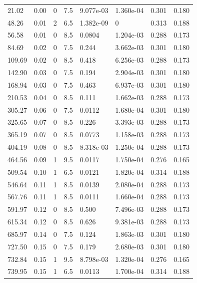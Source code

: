 \documentclass[preview]{standalone}
\begin{document}
{{\begin{tabular}{L{1.2cm}C{1.2cm} C{0.3cm}C{0.5cm} C{1.4cm}C{1.4cm} C{1.4cm}C{1.4cm}}
  21.02  &  0.00  & 0     & 7.5 &  9.077e-03  & 1.360e-04  & 0.301 &  0.180   \\ 
  48.26  &  0.01  & 2     & 6.5 &  1.382e-09  & 0  & 0.313 &  0.188   \\ 
  56.58  &  0.01  & 0     & 8.5 &  0.0804  & 1.204e-03  & 0.288 &  0.173   \\ 
  84.69  &  0.02  & 0     & 7.5 &  0.244  & 3.662e-03  & 0.301 &  0.180   \\ 
  109.69  &  0.02  & 0     & 8.5 &  0.418  & 6.256e-03  & 0.288 &  0.173   \\ 
  142.90  &  0.03  & 0     & 7.5 &  0.194  & 2.904e-03  & 0.301 &  0.180   \\ 
  168.94  &  0.03  & 0     & 7.5 &  0.463  & 6.937e-03  & 0.301 &  0.180   \\ 
  210.53  &  0.04  & 0     & 8.5 &  0.111  & 1.662e-03  & 0.288 &  0.173   \\ 
  305.27  &  0.06  & 0     & 7.5 &  0.0112  & 1.680e-04  & 0.301 &  0.180   \\ 
  325.65  &  0.07  & 0     & 8.5 &  0.226  & 3.393e-03  & 0.288 &  0.173   \\ 
  365.19  &  0.07  & 0     & 8.5 &  0.0773  & 1.158e-03  & 0.288 &  0.173   \\ 
  404.19  &  0.08  & 0     & 8.5 &  8.318e-03  & 1.250e-04  & 0.288 &  0.173   \\ 
  464.56  &  0.09  & 1     & 9.5 &  0.0117  & 1.750e-04  & 0.276 &  0.165   \\ 
  509.54  &  0.10  & 1     & 6.5 &  0.0121  & 1.820e-04  & 0.314 &  0.188   \\ 
  546.64  &  0.11  & 1     & 8.5 &  0.0139  & 2.080e-04  & 0.288 &  0.173   \\ 
  567.76  &  0.11  & 1     & 8.5 &  0.0111  & 1.660e-04  & 0.288 &  0.173   \\ 
  591.97  &  0.12  & 0     & 8.5 &  0.500  & 7.496e-03  & 0.288 &  0.173   \\ 
  615.34  &  0.12  & 0     & 8.5 &  0.626  & 9.381e-03  & 0.288 &  0.173   \\ 
  685.97  &  0.14  & 0     & 7.5 &  0.124  & 1.863e-03  & 0.301 &  0.180   \\ 
  727.50  &  0.15  & 0     & 7.5 &  0.179  & 2.680e-03  & 0.301 &  0.180   \\ 
  732.84  &  0.15  & 1     & 9.5 &  8.798e-03  & 1.320e-04  & 0.276 &  0.165   \\ 
  739.95  &  0.15  & 1     & 6.5 &  0.0113  & 1.700e-04  & 0.314 &  0.188   \\ 

\end{tabular}}}
\end{document}
